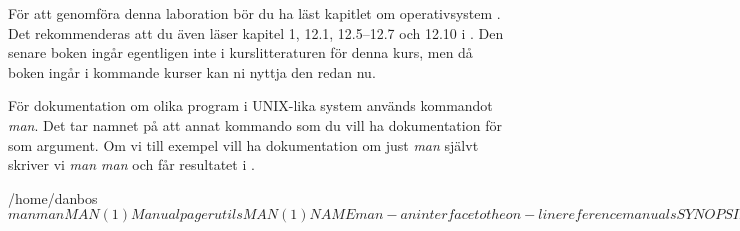 För att genomföra denna laboration bör du ha läst kapitlet om operativsystem 
\citep[kapitel 3]{Brookshear2012csa}.
Det rekommenderas att du även läser kapitel 1, 12.1, 12.5--12.7 och 12.10 
i  \cite{nemeth2011ual}.
Den senare boken ingår egentligen inte i kurslitteraturen för denna kurs, men 
då boken ingår i kommande kurser kan ni nyttja den redan nu.

För dokumentation om olika program i UNIX-lika system används kommandot 
\emph{man}.
Det tar namnet på att annat kommando som du vill ha dokumentation för som 
argument.
Om vi till exempel vill ha dokumentation om just \emph{man} självt skriver vi 
\emph{man man} och får resultatet i .
\begin{terminal}[float=tb,label={lst:manman},caption={Listningen av resultatet vid körningen av kommandot \code{man man}.}]
/home/danbos$ man man
MAN(1)						Manual pager utils						MAN(1)

NAME
	   man - an interface to the on-line reference manuals

SYNOPSIS
	   man  [-C  file]  [-d]  [-D]  [--warnings[=warnings]]  [-R encoding] [-L
	   locale] [-m system[,...]] [-M path] [-S list]  [-e  extension]  [-i|-I]
	   [--regex|--wildcard]   [--names-only]  [-a]  [-u]  [--no-subpages]  [-P
	   pager] [-r prompt] [-7] [-E encoding] [--no-hyphenation] [--no-justifi-
	   cation]  [-p  string]  [-t]  [-T[device]]  [-H[browser]] [-X[dpi]] [-Z]
	   [[section] page ...] ...
	   man -k [apropos options] regexp ...
	   man -K [-w|-W] [-S list] [-i|-I] [--regex] [section] term ...
	   man -f [whatis options] page ...
	   man -l [-C file] [-d] [-D] [--warnings[=warnings]]  [-R  encoding]  [-L
	   locale]  [-P  pager]  [-r  prompt]  [-7] [-E encoding] [-p string] [-t]
	   [-T[device]] [-H[browser]] [-X[dpi]] [-Z] file ...
	   man -w|-W [-C file] [-d] [-D] page ...
	   man -c [-C file] [-d] [-D] page ...
	   man [-hV]

DESCRIPTION
	   man is the system's manual pager. Each page argument given  to  man  is
	   normally  the  name of a program, utility or function.  The manual page
	   associated with each of these arguments is then found and displayed.  A
	   section,  if  provided, will direct man to look only in that section of
	   the manual.  The default action is to search in all  of  the  available
	   sections, following a pre-defined order and to show only the first page
	   found, even if page exists in several sections.

	   The table below shows the section numbers of the manual followed by the
	   types of pages they contain.
[...]
/home/danbos$
\end{terminal}
